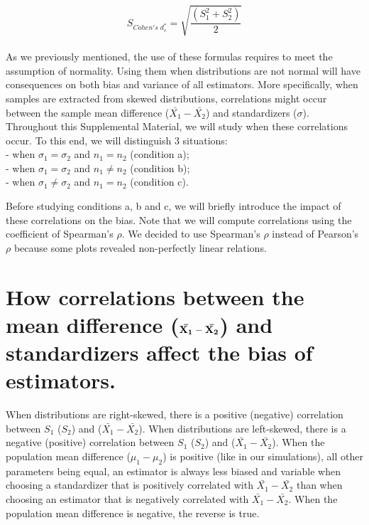 \documentclass[
  english,
  man]{apa6}
\begin{document}
\begin{equation*} 
S_{Cohen's \; d^*_s} = \sqrt{\frac{\left(S^2_{1}+S^2_{2} \right)}{2}}
\label{eq:cohenprimeds}
\end{equation*}\\
As we previously mentioned, the use of these formulas requires to meet the assumption of normality. Using them when distributions are not normal will have consequences on both bias and variance of all estimators. More specifically, when samples are extracted from skewed distributions, correlations might occur between the sample mean difference (\(\bar{X_1}-\bar{X_2}\)) and standardizers (\(\sigma\)). Throughout this Supplemental Material, we will study when these correlations occur. To this end, we will distinguish 3 situations:\\
- when \(\sigma_1=\sigma_2\) and \(n_1=n_2\) (condition a);\\
- when \(\sigma_1=\sigma_2\) and \(n_1\neq n_2\) (condition b);\\
- when \(\sigma_1 \neq \sigma_2\) and \(n_1 = n_2\) (condition c).

Before studying conditions a, b and c, we will briefly introduce the impact of these correlations on the bias. Note that we will compute correlations using the coefficient of Spearman's \(\rho\). We decided to use Spearman's \(\rho\) instead of Pearson's \(\rho\) because some plots revealed non-perfectly linear relations.

\hypertarget{how-correlations-between-the-mean-difference-bf-barx_1-barx_2-and-standardizers-affect-the-bias-of-estimators.}{%
\section{\texorpdfstring{How correlations between the mean difference (\(\bf \bar{X_1}-\bar{X_2}\)) and standardizers affect the bias of estimators.}{How correlations between the mean difference (\textbackslash bf \textbackslash bar\{X\_1\}-\textbackslash bar\{X\_2\}) and standardizers affect the bias of estimators.}}\label{how-correlations-between-the-mean-difference-bf-barx_1-barx_2-and-standardizers-affect-the-bias-of-estimators.}}

When distributions are right-skewed, there is a positive (negative) correlation between \(S_1\) (\(S_2\)) and (\(\bar{X_1}-\bar{X_2}\)). When distributions are left-skewed, there is a negative (positive) correlation between \(S_1\) (\(S_2\)) and (\(\bar{X_1}-\bar{X_2}\)). When the population mean difference (\(\mu_1-\mu_2\)) is positive (like in our simulations), all other parameters being equal, an estimator is always less biased and variable when choosing a standardizer that is positively correlated with \(\bar{X_1}-\bar{X_2}\) than when choosing an estimator that is negatively correlated with \(\bar{X_1}-\bar{X_2}\). When the population mean difference is negative, the reverse is true.
\end{document}
